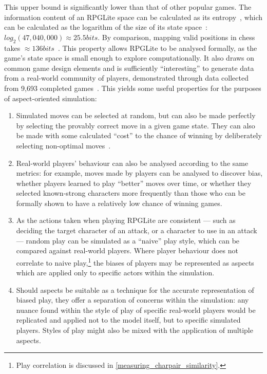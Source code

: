 This upper bound is significantly lower than that of other popular games. The
information content of an RPGLite space can be calculated as its
entropy~\cite{shannon_mathematical_theory_of_communication}, which can be
calculated as the logarithm of the size of its state
space~\cite{hartley_transmission_of_information}: $log_2(47,040,000) \approx
25.5bits$. By comparison, mapping valid positions in chess takes
$\approx{}136bits$~\cite{information_content_chess}. This property allows
RPGLite to be analysed formally, as the game's state space is small enough to
explore computationally. It also draws on common game design elements and is
sufficiently ``interesting'' to generate data from a real-world community of
players, demonstrated through data collected from 9,693 completed
games~\cite{rpglite_dataset}. This yields some useful properties for the
purposes of aspect-oriented simulation:

\begin{enumerate}
  \item Simulated moves can be selected at random, but can also be made
    perfectly by selecting the provably correct move in a given game state. They
    can also be made with some calculated ``cost'' to the chance of winning by
    deliberately selecting non-optimal moves~\cite{kavanagh2021thesis}.
  \item Real-world players' behaviour can also be analysed according to the same
    metrics: for example, moves made by players can be analysed to discover
    bias, whether players learned to play ``better'' moves over time, or whether
    they selected known-strong characters more frequently than those who can be
    formally shown to have a relatively low chance of winning games.
  \item As the actions taken when playing RPGLite are consistent --- such as
    deciding the target character of an attack, or a character to use in an
    attack --- random play can be simulated as a ``naive'' play style, which can
    be compared against real-world players. Where player behaviour does not
    correlate to naive play,\footnote{Play correlation is discussed in
    \cref{measuring_charpair_similarity}.} the biases of players may be
    represented as aspects which are applied only to specific actors within the
    simulation.
  \item Should aspects be suitable as a technique for the accurate
    representation of biased play, they offer a separation of concerns within
    the simulation: any nuance found within the style of play of specific
    real-world players would be replicated and applied not to the model itself,
    but to specific simulated players. Styles of play might also be mixed with
    the application of multiple aspects.
\end{enumerate}

